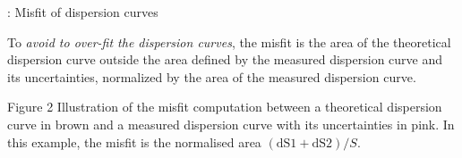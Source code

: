 

\begin{frame}[c]{\titleprefix: Misfit of dispersion curves}

  \centering

  \begin{minipage}{0.5\textwidth}
  \end{minipage}
  \begin{minipage}{0.40\textwidth}
    \tiny

    To \emph{avoid to over-fit the dispersion curves},
    the misfit is the area of the theoretical dispersion curve outside the area
    defined by the measured dispersion curve and its uncertainties,
    normalized by the area of the measured dispersion curve.

    \begin{figureblock}{Figure 2}
      Illustration of the misfit computation between a theoretical dispersion
      curve in brown and a measured dispersion curve with its uncertainties
      in pink.
      In this example, the misfit is the normalised area
      $ (\text{dS1} + \text{dS2}) / S $.
    \end{figureblock}
  \end{minipage}

\end{frame}

